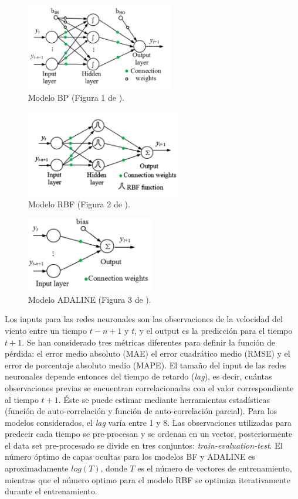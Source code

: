 \documentclass[12pt]{article}
\begin{document}
\begin{figure}[h!]
\centering
\includegraphics[height=1.5in]{figures/BP.PNG}
\caption{Modelo BP (Figura 1 de \citet{Li2}).}
\label{BP}
\end{figure}

\begin{figure}[h!]
\centering
\includegraphics[height=1.5in]{figures/RBF.PNG}
\caption{Modelo RBF (Figura 2 de \citet{Li2}).}
\label{RBF}
\end{figure}

\begin{figure}[h!]
\centering
\includegraphics[height=1.3in]{figures/ADALINE.PNG}
\caption{Modelo ADALINE (Figura 3 de \citet{Li2}).}
\label{ADALINE}
\end{figure}

Los inputs para las redes neuronales son las observaciones de la velocidad del viento entre un tiempo $t-n+1$ y $t$, y el output es la predicción para el tiempo $t+1$. Se han considerado tres métricas diferentes para definir la función de pérdida: el error medio absoluto (MAE) el error cuadrático medio (RMSE) y el error de porcentaje absoluto medio (MAPE).
El tamaño del input de las redes neuronales depende entonces del tiempo de retardo (\textit{lag}), es decir, cuántas observaciones previas se encuentran correlacionadas con el valor correspondiente al tiempo $t+1$. Éste se puede estimar mediante herramientas estadísticas (función de auto-correlación y función de auto-correlación parcial). Para los modelos considerados, el \textit{lag} varía entre 1 y 8. 
Las observaciones utilizadas para predecir cada tiempo se pre-procesan y se ordenan en un vector, posteriormente el data set pre-procesado se divide en tres conjuntos: \textit{train-evaluation-test}. El número óptimo de capas ocultas para los modelos BF y ADALINE es aproximadamente $log(T)$, donde $T$ es el número de vectores de entrenamiento, mientras que el número optimo para el modelo RBF se optimiza iterativamente durante el entrenamiento.
\end{document}
